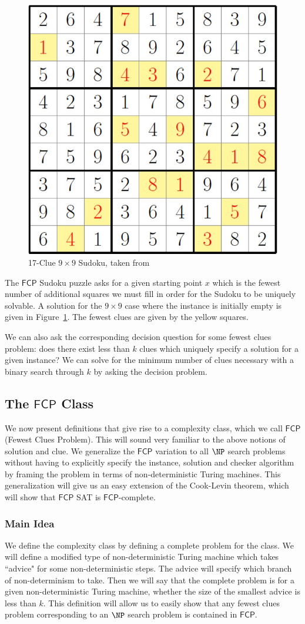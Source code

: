 \documentclass[runningheads,a4paper]{llncs}
\begin{document}
\begin{figure}
\centering
\label{fig:seventeencluesudoku}
\includegraphics[width=0.5\linewidth]{seventeencluesudoku.jpg}
\caption{17-Clue $9 \times 9$ Sudoku, taken from \cite{smallsudoku}}
\end{figure}

The $\mathsf{FCP}$ Sudoku puzzle asks for a given starting point $x$ which is the fewest number of additional squares we must fill in order for the Sudoku to be uniquely solvable. A solution for the $9 \times 9$ case where the instance is initially empty is given in Figure~\ref{fig:seventeencluesudoku}. The fewest clues are given by the yellow squares.

We can also ask the corresponding decision question for some fewest clues problem: does there exist less than $k$ clues which uniquely specify a solution for a given instance? We can solve for the minimum number of clues necessary with a binary search through $k$ by asking the decision problem.

\subsection{The $\mathsf{FCP}$ Class}

We now present definitions that give rise to a complexity class, which we call  $\mathsf{FCP}$ (Fewest Clues Problem). This will sound very familiar to the above notions of solution and clue. We generalize the $\mathsf{FCP}$ variation to all $\NP$ search problems without having to explicitly specify the instance, solution and checker algorithm by framing the problem in terms of non-deterministic Turing machines. This generalization will give us an easy extension of the Cook-Levin theorem, which will show that $\mathsf{FCP}$ SAT is $\mathsf{FCP}$-complete. 

\subsubsection{Main Idea} We define the complexity class by defining a complete problem for the class. We will define a modified type of non-deterministic Turing machine which takes ``advice" for some non-deterministic steps. The advice will specify which branch of non-determinism to take. Then we will say that the complete problem is for a given non-deterministic Turing machine, whether the size of the smallest advice is less than $k$. This definition will allow us to easily show that any fewest clues problem corresponding to an $\NP$ search problem is contained in $\mathsf{FCP}$. 
\end{document}
